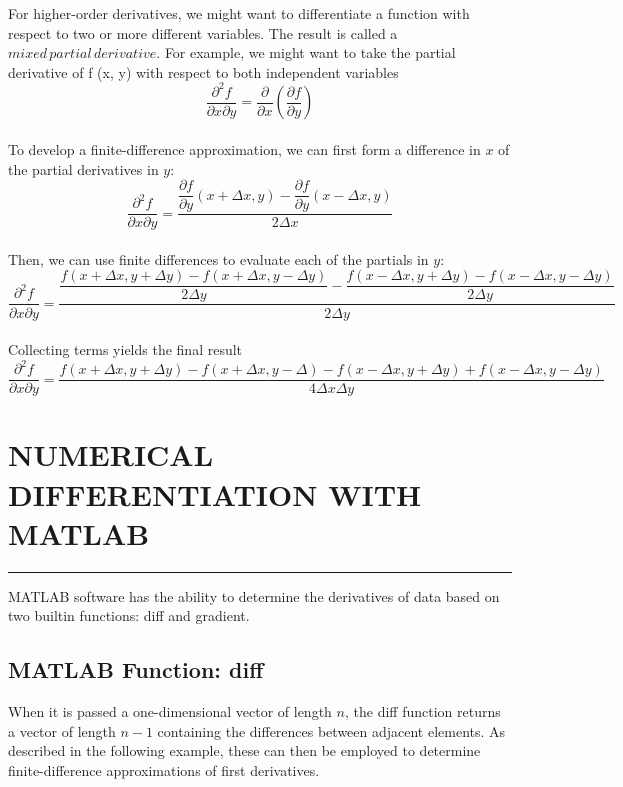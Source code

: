 \documentclass[../main.tex]{subfiles}
\begin{document}
For higher-order derivatives, we might want to differentiate a function with respect to
two or more different variables. The result is called a $mixed\, partial\, derivative$. For example, we might want to take the partial derivative of f (x, y) with respect to both independent
variables
\begin{equation}
	\tag{21.24}
	\dfrac{\partial^{2} f}{\partial x \partial y} = \dfrac{\partial}{\partial x} \left( \dfrac{\partial f}{\partial y} \right)
\end{equation}\\
To develop a finite-difference approximation, we can first form a difference in $x$ of the partial derivatives in $y$:
\begin{equation}
	\tag{21.25}
	\dfrac{\partial^{2} f}{\partial x \partial y} = \dfrac{\dfrac{\partial f}{\partial y} (x + \Delta x,y) - \dfrac{\partial f}{\partial y} (x - \Delta x, y)}{2\Delta x}
\end{equation}\\
Then, we can use finite differences to evaluate each of the partials in $y$:
\begin{equation}
	\tag{21.26}
	\dfrac{\partial^{2} f}{\partial x \partial y} = \dfrac{ \dfrac{f(x+\Delta x, y + \Delta y) - f(x+\Delta x, y - \Delta y)} {2 \Delta y} - \dfrac {f(x - \Delta x, y + \Delta y) - f(x - \Delta x,y - \Delta y)}{2 \Delta y}}{2\Delta y}
\end{equation}\\
Collecting terms yields the final result
\begin{equation}
	\tag{21.27}
	\dfrac{\partial^{2} f}{\partial x \partial y} = \dfrac{ f(x + \Delta x, y+ \Delta y) - f(x+ \Delta x, y-\Delta ) - f(x-\Delta x,y+ \Delta y) + f(x - \Delta x, y- \Delta y)}{4 \Delta x \Delta y}
\end{equation}

\vspace{0,6in}
\section{NUMERICAL DIFFERENTIATION WITH MATLAB}
\vspace{0,1in}
\hrule
\vspace{0,1in}

MATLAB software has the ability to determine the derivatives of data based on two builtin functions: diff and gradient. 

\subsection{MATLAB Function: diff}
When it is passed a one-dimensional vector of length $n$, the diff function returns a vector
of length $n − 1$ containing the differences between adjacent elements. As described in the
following example, these can then be employed to determine finite-difference approximations of first derivatives.
\end{document}
